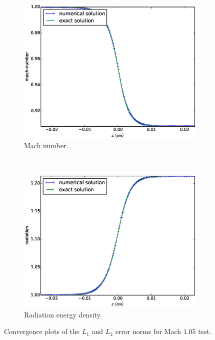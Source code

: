 \documentclass[times,doublespace]{fldauth}%
\begin{document}
\begin{figure}[H]
    \begin{subfigure}{0.5\textwidth}
    \centering
    \includegraphics[width=\linewidth]{figures/cst-xs/mach-1p05-mach-number-plot.eps}
    \caption{Mach number.}\label{fig:mach-1p05-cst-xs-mach}
    \end{subfigure}
    ~
    \begin{subfigure}{0.5\textwidth}
    \centering
    \includegraphics[width=\linewidth]{figures/cst-xs/mach-1p05-radiation-plot.eps}
    \caption{Radiation energy density.}\label{fig:mach-1p05-cst-xs-radiation}
    \end{subfigure}        
\caption{Convergence plots of the $L_1$ and $L_2$ error norms for Mach $1.05$ test.}\label{fig:mach-1p05-cst-xs}    
\end{figure}
%
\end{document}

